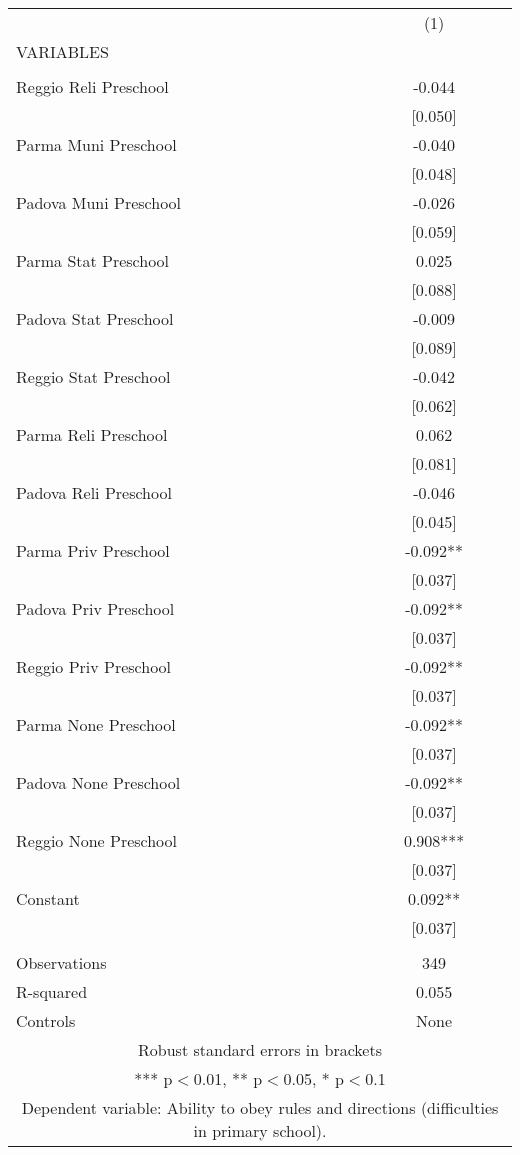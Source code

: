 \begin{tabular}{lc} \hline
 & (1) \\
VARIABLES &  \\ \hline
 &  \\
Reggio Reli Preschool & -0.044 \\
 & [0.050] \\
Parma Muni Preschool & -0.040 \\
 & [0.048] \\
Padova Muni Preschool & -0.026 \\
 & [0.059] \\
Parma Stat Preschool & 0.025 \\
 & [0.088] \\
Padova Stat Preschool & -0.009 \\
 & [0.089] \\
Reggio Stat Preschool & -0.042 \\
 & [0.062] \\
Parma Reli Preschool & 0.062 \\
 & [0.081] \\
Padova Reli Preschool & -0.046 \\
 & [0.045] \\
Parma Priv Preschool & -0.092** \\
 & [0.037] \\
Padova Priv Preschool & -0.092** \\
 & [0.037] \\
Reggio Priv Preschool & -0.092** \\
 & [0.037] \\
Parma None Preschool & -0.092** \\
 & [0.037] \\
Padova None Preschool & -0.092** \\
 & [0.037] \\
Reggio None Preschool & 0.908*** \\
 & [0.037] \\
Constant & 0.092** \\
 & [0.037] \\
 &  \\
Observations & 349 \\
R-squared & 0.055 \\
 Controls & None \\ \hline
\multicolumn{2}{c}{ Robust standard errors in brackets} \\
\multicolumn{2}{c}{ *** p$<$0.01, ** p$<$0.05, * p$<$0.1} \\
\multicolumn{2}{c}{ Dependent variable: Ability to obey rules and directions (difficulties in primary school).} \\
\end{tabular}
